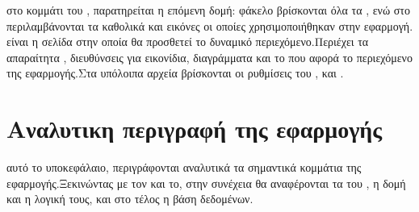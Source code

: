  στο κομμάτι του , παρατηρείται η επόμενη δομή:
 φάκελο  βρίσκονται όλα τα , ενώ στο  περιλαμβάνονται τα καθολικά  και εικόνες οι οποίες χρησιμοποιήθηκαν στην εφαρμογή.\\
  είναι η σελίδα στην οποία θα προσθετεί το δυναμικό περιεχόμενο.Περιέχει τα απαραίτητα , διευθύνσεις για εικονίδια, διαγράμματα και το  που αφορά το περιεχόμενο της εφαρμογής.Στα υπόλοιπα αρχεία βρίσκονται οι ρυθμίσεις του ,  και .

\section{Αναλυτικη περιγραφή της εφαρμογής}
 αυτό το υποκεφάλαιο, περιγράφονται αναλυτικά τα σημαντικά κομμάτια της εφαρμογής.Ξεκινώντας με τον  και το, στην συνέχεια θα αναφέρονται τα  του , η δομή και η λογική τους, και στο τέλος η βάση δεδομένων.

